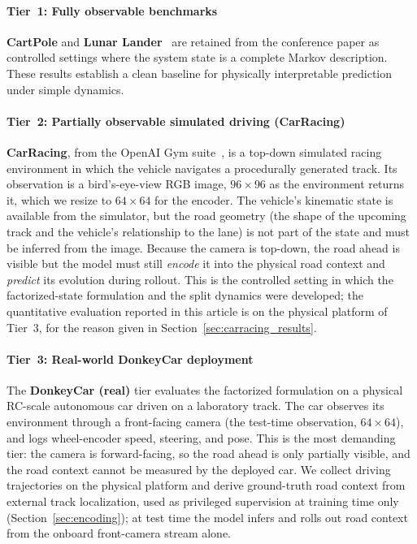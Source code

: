 \documentclass[preprint,12pt]{elsarticle}
\begin{document}
\paragraph{Tier~1: Fully observable benchmarks}
\textbf{CartPole} and \textbf{Lunar Lander}~\cite{brockman2016openai} are retained
from the conference paper as controlled settings where the system state is a
complete Markov description.
These results establish a clean baseline for physically interpretable prediction
under simple dynamics.

\paragraph{Tier~2: Partially observable simulated driving (CarRacing)}
\textbf{CarRacing}, from the OpenAI Gym suite~\cite{brockman2016openai}, is a
top-down simulated racing environment in which the vehicle navigates a
procedurally generated track.
Its observation is a bird's-eye-view RGB image, $96 \times 96$ as the environment
returns it, which we resize to $64 \times 64$ for the encoder.
The vehicle's kinematic state is available from the simulator, but the road
geometry (the shape of the upcoming track and the vehicle's relationship to the
lane) is not part of the state and must be inferred from the image.
Because the camera is top-down, the road ahead is visible but the model must still
\emph{encode} it into the physical road context and \emph{predict} its evolution
during rollout.
This is the controlled setting in which the factorized-state formulation and the
split dynamics were developed; the quantitative evaluation reported in this
article is on the physical platform of Tier~3, for the reason given in
Section~\ref{sec:carracing_results}.

\paragraph{Tier~3: Real-world DonkeyCar deployment}
The \textbf{DonkeyCar (real)} tier evaluates the factorized formulation on a
physical RC-scale autonomous car driven on a laboratory track.
The car observes its environment through a front-facing camera (the test-time
observation, $64 \times 64$), and logs wheel-encoder speed, steering, and pose.
This is the most demanding tier: the camera is forward-facing, so the road ahead
is only partially visible, and the road context cannot be measured by the deployed
car.
We collect driving trajectories on the physical platform and derive ground-truth
road context from external track localization, used as privileged supervision at
training time only (Section~\ref{sec:encoding}); at test time the model infers and
rolls out road context from the onboard front-camera stream alone.
\end{document}
